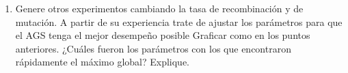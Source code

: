 \documentclass[11pt,letterpaper]{article}
\begin{document}
\begin{enumerate}[label=\alph*)]
        \item Genere otros experimentos cambiando la tasa de recombinación y de mutación. A partir de su experiencia trate de ajustar los parámetros para que el AGS tenga el mejor desempeño posible Graficar como en los puntos anteriores. ¿Cuáles fueron los parámetros con los que encontraron rápidamente el máximo global? Explique.
    \end{enumerate}
\end{document}
